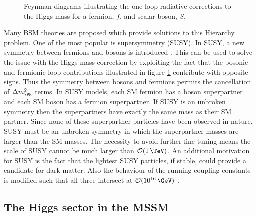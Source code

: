 \begin{figure}[htbp]
\caption{Feynman diagrams illustrating the one-loop radiative corrections to the Higgs
mass for a fermion, $f$, and scalar boson, $S$.}
\label{fig:HiggsMassLoops}
\end{figure}

Many \ac{BSM} theories are proposed which provide solutions to this Hierarchy
problem. One of the most popular is supersymmetry (SUSY). In SUSY, a new
symmetry between fermions and bosons is introduced \cite{Martin:1997ns}. This
can be used to solve the issue with the Higgs mass correction by exploiting the
fact that the bosonic and fermionic loop contributions illustrated in figure
\ref{fig:HiggsMassLoops} contribute with opposite signs. Thus the symmetry
between bosons and fermions permits the cancellation of $\Delta m_{\PH}^{2}$
terms. In SUSY models, each \ac{SM} fermion has a boson superpartner and each
\ac{SM} boson has a fermion superpartner. If SUSY is an unbroken symmetry then
the superpartners have exactly the same mass as their \ac{SM} partner. Since
none of these superpartner particles have been observed in nature, SUSY must be
an unbroken symmetry in which the superpartner masses are larger than the
\ac{SM} masses. The necessity to avoid further fine tuning means the scale of
SUSY cannot be much larger than $\mathcal{O}(1\,\TeV)$. An additional motivation
for SUSY is the fact that the lightest SUSY particles, if stable, could provide
a candidate for dark matter. Also the behaviour of the running coupling
constants is modified such that all three intersect at
$\mathcal{O}(10^{16}\,\GeV)$ \cite{Amaldi:1991cn}.

\subsection{The Higgs sector in the MSSM}
\label{sec:mssmhiggs}

